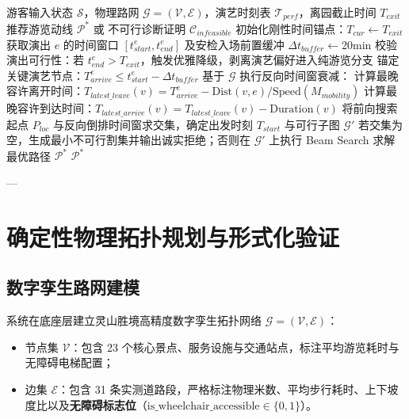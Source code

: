 \documentclass[11pt,a4paper]{ctexart}
\begin{document}
\begin{algorithm}[H]
\small
\caption{倒排时空约束推演算法 (Backward Scheduling)}
\begin{algorithmic}[1]
\Require 游客输入状态 $\mathcal{S}$，物理路网 $\mathcal{G}=(\mathcal{V}, \mathcal{E})$，演艺时刻表 $\mathcal{T}_{perf}$，离园截止时间 $T_{exit}$
\Ensure 推荐游览动线 $\mathcal{P}^*$ 或 不可行诊断证明 $\mathcal{C}_{infeasible}$
\State 初始化刚性时间锚点：$T_{cur} \leftarrow T_{exit}$
    \State 获取演出 $e$ 的时间窗口 $[t_{start}^e, t_{end}^e]$ 及安检入场前置缓冲 $\Delta t_{buffer} \leftarrow 20\text{min}$
    \State 校验演出可行性：若 $t_{end}^e > T_{exit}$，触发优雅降级，剥离演艺偏好进入纯游览分支
    \State 锚定关键演艺节点：$T_{arrive}^e \le t_{start}^e - \Delta t_{buffer}$
\EndIf
\State 基于 $\mathcal{G}$ 执行反向时间窗衰减：
    \State 计算最晚容许离开时间：$T_{latest\_leave}(v) = T_{arrive}^e - \text{Dist}(v, e) / \text{Speed}(M_{mobility})$
    \State 计算最晚容许到达时间：$T_{latest\_arrive}(v) = T_{latest\_leave}(v) - \text{Duration}(v)$
\EndFor
\State 将前向搜索起点 $P_{loc}$ 与反向倒排时间窗求交集，确定出发时刻 $T_{start}$ 与可行子图 $\mathcal{G}'$
\State 若交集为空，生成最小不可行割集并输出诚实拒绝；否则在 $\mathcal{G}'$ 上执行 Beam Search 求解最优路径 $\mathcal{P}^*$
\State \Return $\mathcal{P}^*$
\end{algorithmic}
\end{algorithm}

---

\section{确定性物理拓扑规划与形式化验证}

\subsection{数字孪生路网建模}
系统在底座层建立灵山胜境高精度数字孪生拓扑网络 $\mathcal{G}=(\mathcal{V}, \mathcal{E})$：
\begin{itemize}
    \item 节点集 $\mathcal{V}$：包含 23 个核心景点、服务设施与交通站点，标注平均游览耗时与无障碍电梯配置；
    \item 边集 $\mathcal{E}$：包含 31 条实测道路段，严格标注物理米数、平均步行耗时、上下坡度比以及\textbf{无障碍标志位}（$\text{is\_wheelchair\_accessible} \in \{0, 1\}$）。
\end{itemize}
\end{document}
